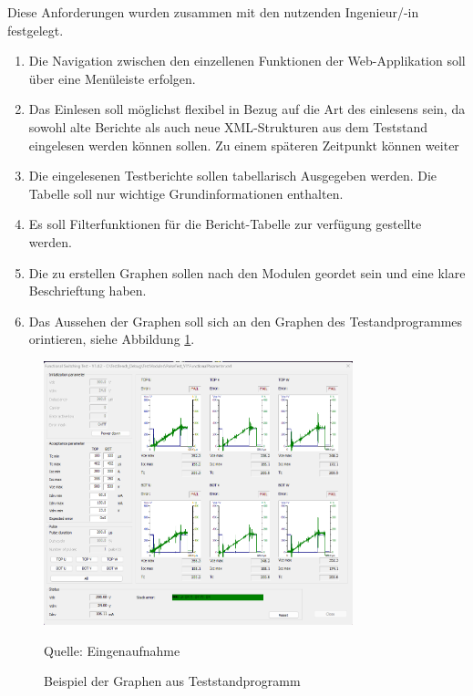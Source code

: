 Diese Anforderungen wurden zusammen mit den nutzenden Ingenieur/-in festgelegt.
\begin{enumerate}ausgearbeitet.

    \item Die Navigation zwischen den einzellenen Funktionen der Web-Applikation soll über eine Menüleiste erfolgen.
    \item Das Einlesen soll möglichst flexibel in Bezug auf die Art des einlesens sein, da sowohl alte Berichte als auch
    neue \ac{XML}-Strukturen aus dem Teststand eingelesen werden können sollen. Zu einem späteren Zeitpunkt können weiter
    \item Die eingelesenen Testberichte sollen tabellarisch Ausgegeben werden. Die Tabelle soll nur wichtige
    Grundinformationen enthalten.
    \item Es soll Filterfunktionen für die Bericht-Tabelle zur verfügung gestellte werden.
    \item Die zu erstellen Graphen sollen nach den Modulen geordet sein und eine klare Beschrieftung haben.
    \item Das Aussehen der Graphen soll sich an den Graphen des Testandprogrammes orintieren, siehe Abbildung \ref{fig: Beispiel der Graphen aus Teststandprogramm}.

\end{enumerate}

\begin{figure}[h]
    \centering
    \includegraphics[width=0.8\textwidth]{Grafiken/Beispiel_Teststandgraphen}
    \caption{Beispiel der Graphen aus Teststandprogramm}
    \label{fig: Beispiel der Graphen aus Teststandprogramm}
    {Quelle: Eingenaufnahme}
\end{figure}

